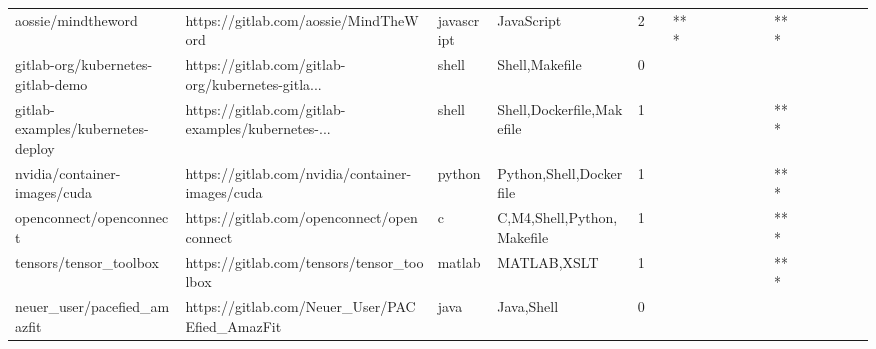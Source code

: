 \begin{tabular}{llllrlllllllllllll}
aossie/mindtheword                                 &              https://gitlab.com/aossie/MindTheWord &        javascript &                                         JavaScript &       2 &         &    *** &           &                &                 &        &           &       *** &          &          &       &              &          \\
gitlab-org/kubernetes-gitlab-demo                  &  https://gitlab.com/gitlab-org/kubernetes-gitla... &             shell &                                     Shell,Makefile &       0 &         &        &           &                &                 &        &           &           &          &          &       &              &          \\
gitlab-examples/kubernetes-deploy                  &  https://gitlab.com/gitlab-examples/kubernetes-... &             shell &                          Shell,Dockerfile,Makefile &       1 &         &        &           &                &                 &        &           &       *** &          &          &       &              &          \\
nvidia/container-images/cuda                       &    https://gitlab.com/nvidia/container-images/cuda &            python &                            Python,Shell,Dockerfile &       1 &         &        &           &                &                 &        &           &       *** &          &          &       &              &          \\
openconnect/openconnect                            &         https://gitlab.com/openconnect/openconnect &                 c &                         C,M4,Shell,Python,Makefile &       1 &         &        &           &                &                 &        &           &       *** &          &          &       &              &          \\
tensors/tensor\_toolbox                             &          https://gitlab.com/tensors/tensor\_toolbox &            matlab &                                        MATLAB,XSLT &       1 &         &        &           &                &                 &        &           &       *** &          &          &       &              &          \\
neuer\_user/pacefied\_amazfit                        &     https://gitlab.com/Neuer\_User/PACEfied\_AmazFit &              java &                                         Java,Shell &       0 &         &        &           &                &                 &        &           &           &          &          &       &              &          \\

\end{tabular}
